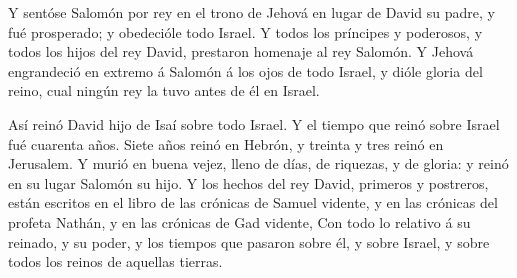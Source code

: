  Y sentóse Salomón por rey en el trono de Jehová en lugar
de David su padre, y fué prosperado; y obedecióle todo Israel.
 Y todos los príncipes y poderosos, y todos los hijos del
rey David, prestaron homenaje al rey Salomón.  Y Jehová
engrandeció en extremo á Salomón á los ojos de todo Israel, y dióle
gloria del reino, cual ningún rey la tuvo antes de él en Israel.

 Así reinó David hijo de Isaí sobre todo Israel.
 Y el tiempo que reinó sobre Israel fué cuarenta años.
Siete años reinó en Hebrón, y treinta y tres reinó en Jerusalem.
 Y murió en buena vejez, lleno de días, de riquezas, y de
gloria: y reinó en su lugar Salomón su hijo.  Y los hechos
del rey David, primeros y postreros, están escritos en el libro de las
crónicas de Samuel vidente, y en las crónicas del profeta Nathán, y en
las crónicas de Gad vidente,  Con todo lo relativo á su
reinado, y su poder, y los tiempos que pasaron sobre él, y sobre Israel,
y sobre todos los reinos de aquellas tierras.
